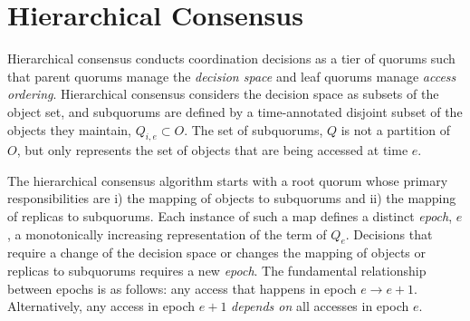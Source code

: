 \documentclass[11pt,letterpaper]{article}
\begin{document}


\section{Hierarchical Consensus}
\vspace{-.5em}

Hierarchical consensus conducts coordination decisions as a tier of quorums such that
parent quorums manage the \emph{decision space} and leaf quorums manage \emph{access ordering}.
Hierarchical consensus considers the decision space as subsets of the object set, and
subquorums are defined by a time-annotated disjoint subset of the objects they maintain,
$Q_{i,e} \subset O$.
The set of subquorums, $Q$ is not a partition of $O$, but only represents the set of
objects that are being accessed at time $e$.


The hierarchical consensus algorithm starts with a root quorum whose primary
responsibilities are i) the mapping of objects to subquorums and ii) the
mapping of replicas to subquorums.
Each instance of such a map defines a distinct \emph{epoch}, $e$, a
monotonically increasing representation of the term of $Q_e$.
Decisions that require a change of the decision space or changes the
mapping of objects or replicas to subquorums requires a new \emph{epoch}.
The fundamental relationship between epochs is as follows: any access that
happens in epoch $e \rightarrow e+1$.
Alternatively, any access in epoch $e+1$ \emph{depends on} all accesses in
epoch $e$.
\end{document}
